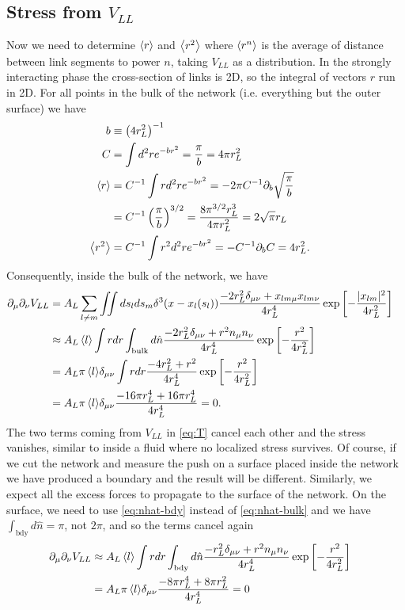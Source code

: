 \documentclass[endfloats,nofootinbib,preprint,floatfix,titlepage,superscriptaddress]{revtex4} %
\begin{document}
\subsection{Stress from $V_{LL}$}
Now we need to determine $\left<r\right>$ and $\left<r^2\right>$ where $\left<r^n\right>$ is the average of distance between link segments to power $n$, taking $V_{LL}$ as a distribution. 
In the strongly interacting phase the %
cross-section of links is 2D, so the integral of vectors $r$ run in 2D. 
For all points in the bulk of the network (i.e. everything but the outer surface) we have
\begin{align}
b &\equiv \left(4r_L^2\right)^{-1}\cr
C &= \int d^2 r e^{-br^2} = {\pi\over b} = 4\pi r_L^2 \cr
\left<r\right> &= C^{-1}\int r d^2 r e^{-br^2} = - 2\pi C^{-1}\partial_b \sqrt{{\pi\over b}} \cr &= C^{-1} \left({\pi\over b}\right)^{3/2}    = {8\pi^{3/2} r_L^3\over 4 \pi r_L^2} = 2\sqrt{\pi} r_L \cr
\left<r^2\right> &= C^{-1}\int r^2 d^2 r e^{-b r^2} = - C^{-1}\partial_b C = 4r_L^2.
\end{align}
%
Consequently, inside the bulk of the network, we have 
\begin{align}
    \partial_\mu\partial_\nu V_{LL} & = A_L\sum_{l\ne m} \iint ds_l ds_m \delta^3(x-x_l(s_l))\frac{-2r_L^2\delta_{\mu\nu}+ x_{lm\mu} x_{lm\nu}}{4r_L^4}
    \exp\left[- {|x_{lm}|^2 \over 4 r_L^2}\right]\cr 
    & \approx {A_L\left<l\right>} \int r dr \int_\mathrm{bulk} d\hat{n} \frac{-2r_L^2\delta_{\mu\nu}+ r^2 n_\mu n_\nu}{4r_L^4}
    \exp\left[- {r^2 \over 4 r_L^2}\right]\cr
    &= {A_L\pi\left<l\right>} \delta_{\mu\nu} \int r dr  \frac{-4 r_L^2+ r^2 }{4r_L^4}
    \exp\left[- {r^2 \over 4 r_L^2}\right]\cr
    &= {A_L\pi\left<l\right>} \delta_{\mu\nu}  \frac{-16\pi r_L^4+ 16\pi r_L^4 }{4r_L^4} = 0 .
    \label{eq:stress-bulk}
\end{align}
The two terms coming from $V_{LL}$ in \eqref{eq:T} cancel each other and the stress vanishes, similar to inside a fluid where no localized stress survives. 
Of course, if we cut the network and measure the push on a surface placed inside the network we have produced a boundary and the result will be different. 
Similarly, we expect all the excess forces to propagate to the surface of the network. 
On the surface, we need to use \eqref{eq:nhat-bdy}  instead of \eqref{eq:nhat-bulk} and we have $\int_\mathrm{bdy} d\hat{n} = \pi $, not $2\pi$, and so the terms cancel again
\begin{align}
    \ro_\mu\ro_\nu V_{LL} 
    & \approx {A_L\be{l}} \int r dr \int_\mathrm{bdy} d\hat{n} \frac{-r_L^2\delta_{\mu\nu}+ r^2 n_\mu n_\nu}{4r_L^4}
    \exp\left[- {r^2 \over 4 r_L^2}\right]\cr
    &= {A_L\pi\be{l}} \delta_{\mu\nu}  \frac{-8\pi r_L^4+ 8\pi r_L^2 }{4r_L^4} =0%
    \label{eq:stress-bdy}
\end{align}
\end{document}
